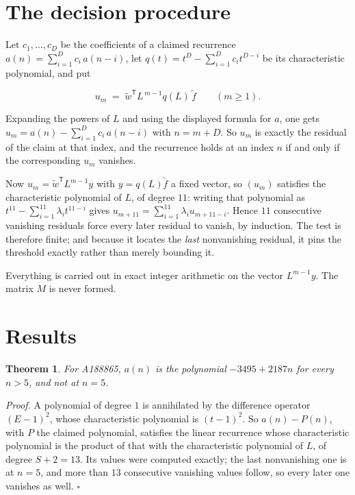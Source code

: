 \documentclass[11pt]{article}
\newtheorem{theorem}{Theorem}
\theoremstyle{definition}
\begin{document}
\section{The decision procedure}

Let $c_1,\dots,c_D$ be the coefficients of a claimed recurrence $a(n) = \sum_{i=1}^{D} c_i\,a(n-i)$, let $q(t) = t^{D} - \sum_{i=1}^{D} c_i t^{D-i}$ be its characteristic polynomial, and put

\[u_m \;=\; \tilde w^{\mathsf T} L^{\,m-1} q(L)\,\tilde f \qquad (m \ge 1).\]

Expanding the powers of $L$ and using the displayed formula for $a$, one gets $u_m = a(n) - \sum_{i=1}^{D} c_i\,a(n-i)$ with $n = m + D$. So $u_m$ is exactly the residual of the claim at that index, and the recurrence holds at an index $n$ if and only if the corresponding $u_m$ vanishes.

Now $u_m = \tilde w^{\mathsf T} L^{m-1} y$ with $y = q(L)\tilde f$ a fixed vector, so $(u_m)$ satisfies the characteristic polynomial of $L$, of degree $11$: writing that polynomial as $t^{11} - \sum_{i=1}^{11} \lambda_i t^{11-i}$ gives $u_{m+11} = \sum_{i=1}^{11} \lambda_i u_{m+11-i}$. Hence $11$ consecutive vanishing residuals force every later residual to vanish, by induction. The test is therefore finite; and because it locates the {\itshape last} nonvanishing residual, it pins the threshold exactly rather than merely bounding it.

Everything is carried out in exact integer arithmetic on the vector $L^{m-1}y$. The matrix $M$ is never formed.

\section{Results}

\begin{theorem} For A188865, $a(n)$ is the polynomial $-3495 + 2187n$ for every $n > 5$, and not at $n = 5$.\end{theorem}

{\itshape Proof.} A polynomial of degree $1$ is annihilated by the difference operator $(E-1)^{2}$, whose characteristic polynomial is $(t-1)^{2}$. So $a(n) - P(n)$, with $P$ the claimed polynomial, satisfies the linear recurrence whose characteristic polynomial is the product of that with the characteristic polynomial of $L$, of degree $S + 2 = 13$. Its values were computed exactly; the last nonvanishing one is at $n = 5$, and more than $13$ consecutive vanishing values follow, so every later one vanishes as well. $\square$
\end{document}
